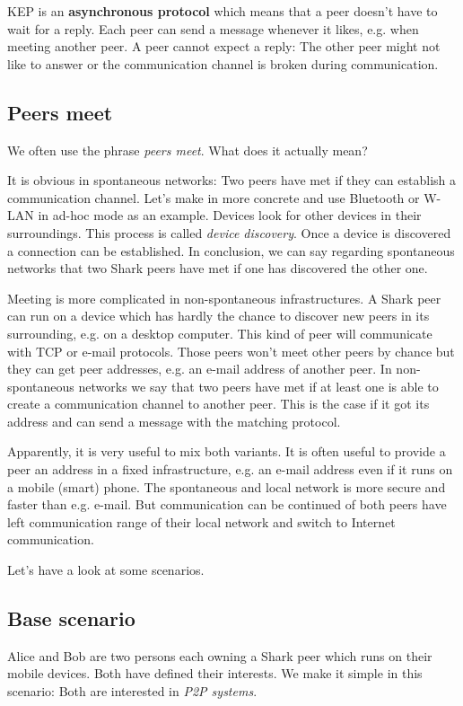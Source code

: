 KEP is an {\bf asynchronous protocol} which means that a peer doesn't have to wait for a reply. Each peer can send a message whenever it likes, e.g. when meeting another peer. A peer cannot expect a reply: The other peer might not like to answer or the communication channel is broken during communication.

\subsection{Peers meet}
We often use the phrase {\it peers meet}. What does it actually mean?

It is obvious in spontaneous networks: Two peers have met if they can establish a communication channel. Let's make in more concrete and use Bluetooth or W-LAN in ad-hoc mode as an example. Devices look for other devices in their surroundings.
This process is called {\it device discovery}. Once a device is discovered a connection can be established. In conclusion, we can say regarding spontaneous networks that two Shark peers have met if one has discovered the other one.

Meeting is more complicated in non-spontaneous infrastructures. A Shark peer can run on a device which has hardly the chance to discover new peers in its surrounding, e.g. on a desktop computer. This kind of peer will communicate with TCP or e-mail protocols. Those peers won't meet other peers by chance but they can get peer addresses, e.g. an e-mail address of another peer. In non-spontaneous networks we say that two peers have met if at least one is able to create a communication channel to another peer. This is the case if it got its address and can send a message with the matching protocol.

Apparently, it is very useful to mix both variants. It is often useful to provide a peer an address in a fixed infrastructure, e.g. an e-mail address even if it runs on a mobile (smart) phone. The spontaneous and local network is more secure and faster than e.g. e-mail. But communication can be continued of both peers have left communication range of their local network and switch to Internet communication.

Let's have a look at some scenarios.

\subsection{Base scenario}
\label{sec:concepts:baseScenario}
Alice and Bob are two persons each owning a Shark peer which runs on their mobile devices. Both have defined their interests. We make it simple in this scenario:
Both are interested in {\it P2P systems}.

